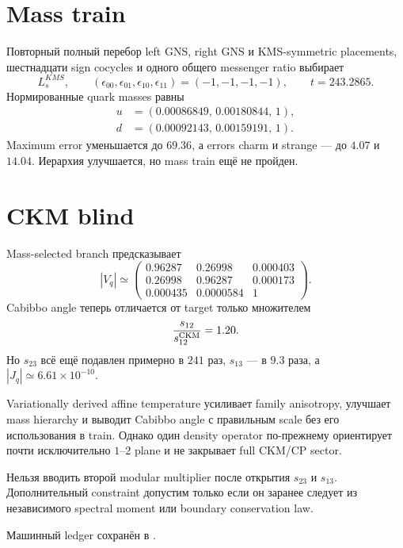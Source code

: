 \section{Mass train}

Повторный полный перебор left GNS, right GNS и KMS-symmetric placements,
шестнадцати sign cocycles и одного общего messenger ratio выбирает
\begin{equation}
 L_s^{KMS},
 \qquad
 (\epsilon_{00},\epsilon_{01},\epsilon_{10},\epsilon_{11})=(-1,-1,-1,-1),
 \qquad
 t=243.2865.
\end{equation}
Нормированные quark masses равны
\begin{align}
 u&=(0.00086849,\,0.00180844,\,1),\\
 d&=(0.00092143,\,0.00159191,\,1).
\end{align}
Maximum error уменьшается до \(69.36\), а errors charm и strange --- до
\(4.07\) и \(14.04\). Иерархия улучшается, но mass train ещё не пройден.

\section{CKM blind}

Mass-selected branch предсказывает
\begin{equation}
 |V_q|\simeq
 \begin{pmatrix}
 0.96287&0.26998&0.000403\\
 0.26998&0.96287&0.000173\\
 0.000435&0.0000584&1
 \end{pmatrix}.
\end{equation}
Cabibbo angle теперь отличается от target только множителем
\begin{equation}
 \frac{s_{12}}{s_{12}^{\rm CKM}}=1.20.
\end{equation}
Но \(s_{23}\) всё ещё подавлен примерно в \(241\) раз, \(s_{13}\) --- в
\(9.3\) раза, а \(|J_q|\simeq6.61\times10^{-10}\).

\begin{theorem}
Variationally derived affine temperature усиливает family anisotropy,
улучшает mass hierarchy и выводит Cabibbo angle с правильным scale без его
использования в train. Однако один density operator по-прежнему ориентирует
почти исключительно \(1\)--\(2\) plane и не закрывает full CKM/CP sector.
\end{theorem}

\begin{nogocriterion}
Нельзя вводить второй modular multiplier после открытия \(s_{23}\) и
\(s_{13}\). Дополнительный constraint допустим только если он заранее следует
из независимого spectral moment или boundary conservation law.
\end{nogocriterion}

Машинный ledger сохранён в
.